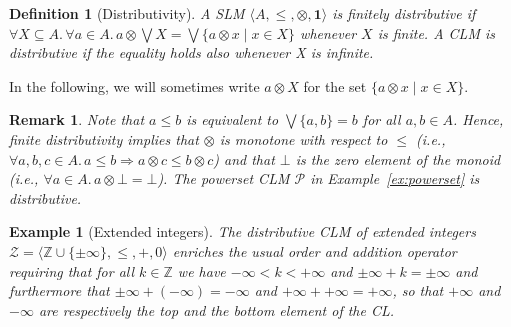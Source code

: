 \documentclass[a4paper]{elsarticle}
\newtheorem{definition}{Definition}
\newtheorem{example}{Example}
\newtheorem{remark}{Remark}
\newtheorem{lemma}{Lemma}
\newcommand{\monop}{\otimes}
\newcommand{\1}{\mathbf{1}}
\begin{document}
\begin{definition}[Distributivity]
	\label{dist}
	A SLM $\langle A, \leq, \monop, \1 \rangle$ is finitely distributive if
	$\forall X \subseteq A.\, \forall a \in A.\,  a \monop  \bigvee X = \bigvee \{a \monop x \mid x \in X\}$ 
	whenever $X$ is finite.
	A CLM is distributive if the equality holds also whenever X is infinite. %
\end{definition}

In the following, we will sometimes write $a \otimes X$ for the set  $\{a \monop x \mid x \in X\}$.

\begin{remark}
	Note that $a \leq b$ is equivalent to $\bigvee \{a,b\} = b$ for all $a, b \in A$.
	Hence, finite distributivity implies that $\otimes$ is monotone with respect to $\leq$ 
	(i.e., $\forall a, b, c \in A.\, a \leq b \Rightarrow a \otimes c \leq  b \otimes c$)
	and that $\bot$ is the zero element
	of the monoid (i.e., $\forall a \in A.\, a\otimes  \bot = \bot$).
	The powerset CLM $\mathcal{P}$ in Example~\ref{ex:powerset} is distributive.
\end{remark}

\begin{example}[Extended integers]\label{ex:bipolar}
	The distributive CLM of extended integers $\mathcal{Z} = \langle \mathbb{Z} \cup \{\pm \infty\}, \leq, +, 0 \rangle$
	enriches the usual order and addition operator requiring that for all
	$k \in \mathbb{Z}$ we have $-\infty < k < +\infty$ and $\pm\infty + k = \pm \infty$
	and furthermore that $\pm\infty + (-\infty) = -\infty$ and $+\infty + +\infty = +\infty$, so that
	$+\infty$ and $-\infty$ are respectively the top and the bottom element of the CL.
\end{example}

% 
% 
\end{document}

